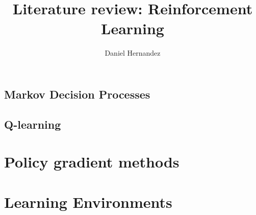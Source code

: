 \documentclass{article}
\title{\textbf{Literature review: Reinforcement Learning}}
\author{Daniel Hernandez}
\date{ }
\begin{document}
\maketitle

\tableofcontents

% 
% 
%
%
    \subsection{Markov Decision Processes}\label{section:markov-decision-processes}
    

    
    \subsection{Q-learning}\label{section:q-learning}
    
 
\section{Policy gradient methods}\label{section:policy-gradient}

%
% 
% 
% 

\section{Learning Environments}

\end{document}
